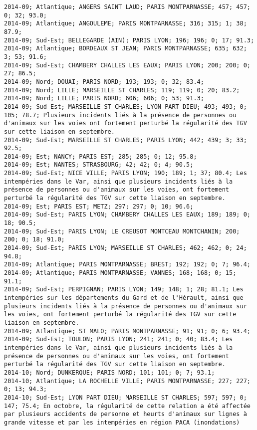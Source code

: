 \documentclass{article}
\begin{document}
\begin{Verbatim}[commandchars=\\\{\}]
2014-09; Atlantique; ANGERS SAINT LAUD; PARIS MONTPARNASSE; 457; 457; 0; 32; 93.0; 
2014-09; Atlantique; ANGOULEME; PARIS MONTPARNASSE; 316; 315; 1; 38; 87.9; 
2014-09; Sud-Est; BELLEGARDE (AIN); PARIS LYON; 196; 196; 0; 17; 91.3; 
2014-09; Atlantique; BORDEAUX ST JEAN; PARIS MONTPARNASSE; 635; 632; 3; 53; 91.6; 
2014-09; Sud-Est; CHAMBERY CHALLES LES EAUX; PARIS LYON; 200; 200; 0; 27; 86.5; 
2014-09; Nord; DOUAI; PARIS NORD; 193; 193; 0; 32; 83.4; 
2014-09; Nord; LILLE; MARSEILLE ST CHARLES; 119; 119; 0; 20; 83.2; 
2014-09; Nord; LILLE; PARIS NORD; 606; 606; 0; 53; 91.3; 
2014-09; Sud-Est; MARSEILLE ST CHARLES; LYON PART DIEU; 493; 493; 0; 105; 78.7; Plusieurs incidents liés à la présence de personnes ou d'animaux sur les voies ont fortement perturbé la régularité des TGV sur cette liaison en septembre.
2014-09; Sud-Est; MARSEILLE ST CHARLES; PARIS LYON; 442; 439; 3; 33; 92.5; 
2014-09; Est; NANCY; PARIS EST; 285; 285; 0; 12; 95.8; 
2014-09; Est; NANTES; STRASBOURG; 42; 42; 0; 4; 90.5; 
2014-09; Sud-Est; NICE VILLE; PARIS LYON; 190; 189; 1; 37; 80.4; Les intempéries dans le Var, ainsi que plusieurs incidents liés à la présence de personnes ou d'animaux sur les voies, ont fortement perturbé la régularité des TGV sur cette liaison en septembre.
2014-09; Est; PARIS EST; METZ; 297; 297; 0; 10; 96.6; 
2014-09; Sud-Est; PARIS LYON; CHAMBERY CHALLES LES EAUX; 189; 189; 0; 18; 90.5; 
2014-09; Sud-Est; PARIS LYON; LE CREUSOT MONTCEAU MONTCHANIN; 200; 200; 0; 18; 91.0; 
2014-09; Sud-Est; PARIS LYON; MARSEILLE ST CHARLES; 462; 462; 0; 24; 94.8; 
2014-09; Atlantique; PARIS MONTPARNASSE; BREST; 192; 192; 0; 7; 96.4; 
2014-09; Atlantique; PARIS MONTPARNASSE; VANNES; 168; 168; 0; 15; 91.1; 
2014-09; Sud-Est; PERPIGNAN; PARIS LYON; 149; 148; 1; 28; 81.1; Les intempéries sur les départements du Gard et de l'Hérault, ainsi que plusieurs incidents liés à la présence de personnes ou d'animaux sur les voies, ont fortement perturbé la régularité des TGV sur cette liaison en septembre.
2014-09; Atlantique; ST MALO; PARIS MONTPARNASSE; 91; 91; 0; 6; 93.4; 
2014-09; Sud-Est; TOULON; PARIS LYON; 241; 241; 0; 40; 83.4; Les intempéries dans le Var, ainsi que plusieurs incidents liés à la présence de personnes ou d'animaux sur les voies, ont fortement perturbé la régularité des TGV sur cette liaison en septembre.
2014-10; Nord; DUNKERQUE; PARIS NORD; 101; 101; 0; 7; 93.1; 
2014-10; Atlantique; LA ROCHELLE VILLE; PARIS MONTPARNASSE; 227; 227; 0; 13; 94.3; 
2014-10; Sud-Est; LYON PART DIEU; MARSEILLE ST CHARLES; 597; 597; 0; 147; 75.4; En octobre, la régularité de cette relation a été affectée par plusieurs accidents de personne et heurts d'animaux sur lignes à grande vitesse et par les intempéries en région PACA (inondations)

\end{Verbatim}
\end{document}
